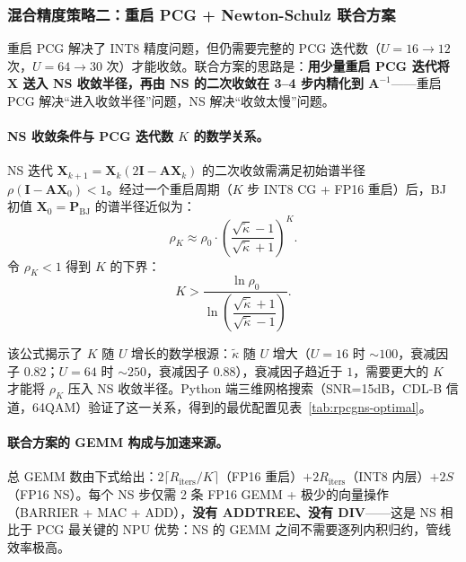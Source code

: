 \documentclass{CjC}
\begin{document}
    \subsubsection{混合精度策略二：重启 PCG + Newton-Schulz 联合方案}
    
    重启 PCG 解决了 INT8 精度问题，但仍需要完整的 PCG 迭代数（$U=16\rightarrow 12$ 次，$U=64\rightarrow 30$ 次）才能收敛。联合方案的思路是：\textbf{用少量重启 PCG 迭代将 $\bm{X}$ 送入 NS 收敛半径，再由 NS 的二次收敛在 3--4 步内精化到 $\bm{A}^{-1}$}——重启 PCG 解决``进入收敛半径''问题，NS 解决``收敛太慢''问题。
    
    \paragraph{NS 收敛条件与 PCG 迭代数 $K$ 的数学关系。}
    NS 迭代 $\bm{X}_{k+1}=\bm{X}_{k}(2\bm{I}-\bm{A}\bm{X}_{k})$ 的二次收敛需满足初始谱半径
    $\rho(\bm{I}-\bm{A}\bm{X}_{0})<1$。经过一个重启周期（$K$ 步 INT8 CG + FP16 重启）后，BJ 初值
    $\bm{X}_{0}=\bm{P}_{\text{BJ}}$ 的谱半径近似为：
    \begin{equation}
        \rho_{K} \approx \rho_{0}\cdot\left(\frac{\sqrt{\tilde\kappa}-1}{\sqrt{\tilde\kappa}+1}\right)^{K}.
    \end{equation}
    令 $\rho_{K}<1$ 得到 $K$ 的下界：
    \begin{equation}
        \boxed{K > \frac{\ln\rho_{0}}
        {\ln\!\left(\dfrac{\sqrt{\tilde\kappa}+1}{\sqrt{\tilde\kappa}-1}\right)}}.
        \label{eq:K-bound}
    \end{equation}
    
    该公式揭示了 $K$ 随 $U$ 增长的数学根源：$\tilde\kappa$ 随 $U$ 增大（$U=16$ 时 $\sim100$，衰减因子 $0.82$；$U=64$ 时 $\sim250$，衰减因子 $0.88$），衰减因子趋近于 $1$，需要更大的 $K$ 才能将 $\rho_{K}$ 压入 NS 收敛半径。Python 端三维网格搜索（SNR=15dB，CDL-B 信道，64QAM）验证了这一关系，得到的最优配置见表~\ref{tab:rpcgns-optimal}。
    
    \paragraph{联合方案的 GEMM 构成与加速来源。}
    总 GEMM 数由下式给出：$2\lceil R_{\text{iters}}/K\rceil$（FP16 重启）$+2R_{\text{iters}}$（INT8 内层）$+2S$（FP16 NS）。每个 NS 步仅需 2 条 FP16 GEMM + 极少的向量操作（BARRIER + MAC + ADD），\textbf{没有 ADDTREE、没有 DIV}——这是 NS 相比于 PCG 最关键的 NPU 优势：NS 的 GEMM 之间不需要逐列内积归约，管线效率极高。
    
\end{document}
